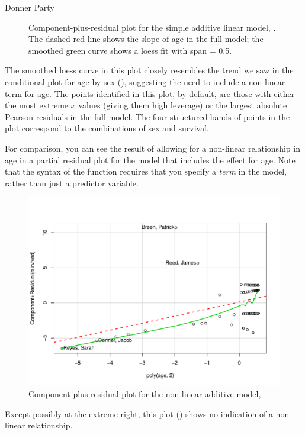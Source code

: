 \documentclass[11pt]{book}
\renewenvironment{knitrout}{\small\renewcommand{\baselinestretch}{.85}}{} %
\begin{document}
\begin{Example}[donner3]{Donner Party}
\begin{knitrout}
\begin{figure}[!htbp]
\caption[Component-plus-residual plot for the simple additive linear model]{Component-plus-residual plot for the simple additive linear model, . The dashed red line shows the slope of age in the full model; the smoothed green curve shows a loess fit with span = 0.5.\label{fig:donner-cr1}}
\end{figure}


\end{knitrout}
The smoothed loess curve in this plot closely resembles the trend we saw in the conditional
plot for age by sex (), suggesting the need to include a non-linear
term for age.  The points identified in this plot, by default, are those with either the most extreme
$x$ values (giving them high leverage) or the largest absolute Pearson residuals
in the full model. The four structured bands of points in the plot correspond to the combinations
of sex and survival.

For comparison, you can see the result of allowing for a non-linear relationship in
age in a partial residual plot for the model  that includes the
effect  for age. Note that the syntax of the  function 
requires that you specify a \emph{term} in the model, rather than just a predictor variable. 
\begin{knitrout}
\color{fgcolor}\begin{kframe}
\begin{alltt}
 \hlopt{~}\hlstd{),} \hlstd{=}\hlstd{)}
\end{alltt}
\end{kframe}\begin{figure}[!htbp]


\centerline{\includegraphics[width=.6\textwidth]{ch07/fig/donner-cr2} }

\caption[Component-plus-residual plot for the non-linear additive  model]{Component-plus-residual plot for the non-linear additive  model, \label{fig:donner-cr2}}
\end{figure}


\end{knitrout}
Except possibly at the extreme right, this plot () shows no indication of a non-linear relationship.

\end{Example}
\end{document}
